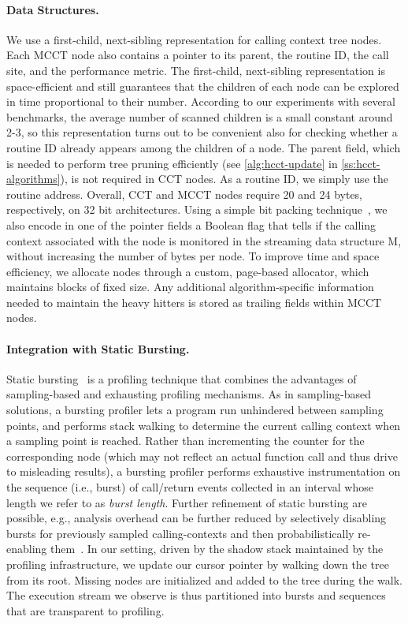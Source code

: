 \paragraph*{Data Structures.} We use a first-child, next-sibling representation for calling context tree nodes. Each MCCT node also contains a pointer to its parent, the routine ID, the call site, and the performance metric. The first-child, next-sibling representation is space-efficient and still guarantees that the children of each node can be explored in time proportional to their number. According to our experiments with several benchmarks, the average number of scanned children is a small constant around 2-3, so this representation turns out to be convenient also for checking whether a routine ID already appears among the children of a node. The parent field, which is needed to perform tree pruning efficiently (see \myalgorithm\ref{alg:hcct-update} in \mysection\ref{ss:hcct-algorithms}), is not required in CCT nodes. As a routine ID, we simply use the routine address. Overall, CCT and MCCT nodes require 20 and 24 bytes, respectively, on 32 bit architectures. Using a simple bit packing technique~\cite{Standish80}, we also encode in one of the pointer fields a Boolean flag that tells if the calling context associated with the node is monitored in the streaming data structure M, without increasing the number of bytes per node. To improve time and space efficiency, we allocate nodes through a custom, page-based allocator, which maintains blocks of fixed size. Any additional algorithm-specific information needed to maintain the heavy hitters is stored as trailing fields within MCCT nodes.

\paragraph*{Integration with Static Bursting.} Static bursting~\cite{Zhuang06} is a profiling technique that combines the advantages of sampling-based and exhausting profiling mechanisms. As in sampling-based solutions, a bursting profiler lets a program run unhindered between sampling points, and performs stack walking to determine the current calling context when a sampling point is reached. Rather than incrementing the counter for the corresponding node (which may not reflect an actual function call and thus drive to misleading results), a bursting profiler performs exhaustive instrumentation on the sequence (i.e.,  burst) of call/return events collected in an interval whose length we refer to as {\em burst length}. Further refinement of static bursting are possible, e.g., analysis overhead can be further reduced by selectively disabling bursts for previously sampled calling-contexts and then probabilistically re-enabling them~\cite{Zhuang06}. In our setting, driven by the shadow stack maintained by the profiling infrastructure, we update our cursor pointer by walking down the tree from its root. Missing nodes are initialized and added to the tree during the walk. The execution stream we observe is thus partitioned into bursts and sequences that are transparent to profiling.

